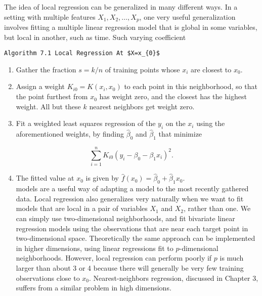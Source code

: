 \documentclass[10pt]{article}
\begin{document}
The idea of local regression can be generalized in many different ways. In a setting with multiple features $X_{1}, X_{2}, \ldots, X_{p}$, one very useful generalization involves fitting a multiple linear regression model that is global in some variables, but local in another, such as time. Such varying coefficient


\begin{verbatim}
Algorithm 7.1 Local Regression At $X=x_{0}$
\end{verbatim}

\begin{enumerate}
  \item Gather the fraction $s=k / n$ of training points whose $x_{i}$ are closest to $x_{0}$.
  \item Assign a weight $K_{i 0}=K\left(x_{i}, x_{0}\right)$ to each point in this neighborhood, so that the point furthest from $x_{0}$ has weight zero, and the closest has the highest weight. All but these $k$ nearest neighbors get weight zero.
  \item Fit a weighted least squares regression of the $y_{i}$ on the $x_{i}$ using the aforementioned weights, by finding $\hat{\beta}_{0}$ and $\hat{\beta}_{1}$ that minimize
\end{enumerate}


\begin{equation*}
\sum_{i=1}^{n} K_{i 0}\left(y_{i}-\beta_{0}-\beta_{1} x_{i}\right)^{2} . \tag{7.14}
\end{equation*}


\begin{enumerate}
  \setcounter{enumi}{3}
  \item The fitted value at $x_{0}$ is given by $\hat{f}\left(x_{0}\right)=\hat{\beta}_{0}+\hat{\beta}_{1} x_{0}$.\\
models are a useful way of adapting a model to the most recently gathered data. Local regression also generalizes very naturally when we want to fit models that are local in a pair of variables $X_{1}$ and $X_{2}$, rather than one. We can simply use two-dimensional neighborhoods, and fit bivariate linear regression models using the observations that are near each target point in two-dimensional space. Theoretically the same approach can be implemented in higher dimensions, using linear regressions fit to $p$-dimensional neighborhoods. However, local regression can perform poorly if $p$ is much larger than about 3 or 4 because there will generally be very few training observations close to $x_{0}$. Nearest-neighbors regression, discussed in Chapter 3, suffers from a similar problem in high dimensions.
\end{enumerate}
\end{document}
